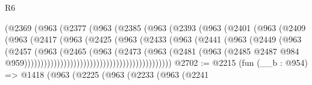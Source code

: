 \begin{lexlean}{R6}
\begin{coremodule}
                                (@2369
                                  (@963
                                    (@2377
                                      (@963
                                        (@2385
                                          (@963
                                            (@2393
                                              (@963
                                                (@2401
                                                  (@963
                                                    (@2409
                                                      (@963
                                                        (@2417
                                                          (@963
                                                            (@2425
                                                              (@963
                                                                (@2433
                                                                  (@963
                                                                    (@2441
                                                                      (@963
                                                                        (@2449
                                                                          (@963
                                                                            (@2457
                                                                              (@963
                                                                                (@2465
                                                                                  (@963
                                                                                    (@2473
                                                                                      (@963
                                                                                        (@2481
                                                                                          (@963
                                                                                            (@2485
                                                                                              @2487
                                                                                              @984
                                                                                              @959)))))))))))))))))))))))))))))))))))))))))))))
@2702 := @2215
    (fun (__b : @954) =>
    @1418
      (@963
        (@2225
          (@963
            (@2233
              (@963
                (@2241

\end{coremodule}
\end{lexlean}
